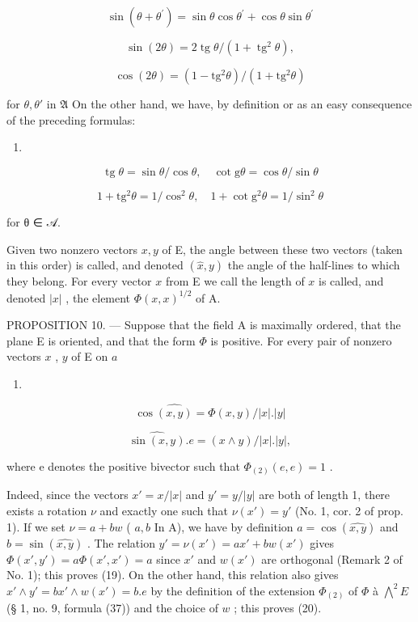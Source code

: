 \[
\sin (\theta + \theta^ {\prime}) = \sin \theta \cos \theta^ {\prime} + \cos \theta \sin \theta^ {\prime}\tag{16}
\]

\[
\sin (2 \theta) = 2 \operatorname{tg} \theta / (1 + \operatorname{tg} ^ {2} \theta),
\]

\[
\cos (2 \theta) = (1 - \mathrm{tg} ^ {2} \theta) / (1 + \mathrm{tg} ^ {2} \theta)
\]

for \(\theta, \theta'\) in \(\mathfrak{A}\) On the other hand, we have, by definition or as an easy consequence of the preceding formulas:

\begin{enumerate}
\def\labelenumi{(\arabic{enumi})}
\setcounter{enumi}{16}
\tightlist
\item
\end{enumerate}

\[
\operatorname{tg} \theta = \sin \theta / \cos \theta , \quad \cot \mathrm{g} \theta = \cos \theta / \sin \theta\tag{18}
\]

\[
1 + \mathrm{tg} ^ {2} \theta = 1 / \cos^ {2} \theta , \quad 1 + \cot \mathrm{g} ^ {2} \theta = 1 / \sin^ {2} \theta
\]

for θ ∈ 𝒜.

Given two nonzero vectors \(x, y\) of E, the angle between these two vectors (taken in this order) is called, and denoted \((\widehat{x}, y)\) the angle of the half-lines to which they belong. For every vector \(x\) from E we call the length of \(x\) is called, and denoted \(|x|\) , the element \(\Phi(x, x)^{1/2}\) of A.

PROPOSITION 10. --- Suppose that the field A is maximally ordered, that the plane E is oriented, and that the form \(\Phi\) is positive. For every pair of nonzero vectors \(x\) , \(y\) of E on \(a\)

\begin{enumerate}
\def\labelenumi{(\arabic{enumi})}
\setcounter{enumi}{18}
\tightlist
\item
\end{enumerate}

\[
\cos \widehat {(x , y)} = \Phi (x, y) / | x |. | y |\tag{20}
\]

\[
\widehat {\sin (x , y)}. e = (x \wedge y) / | x |. | y |,
\]

where e denotes the positive bivector such that \(\Phi_{(2)}(e, e) = 1\) .

Indeed, since the vectors \(x' = x / |x|\) and \(y' = y / |y|\) are both of length 1, there exists a rotation \(\nu\) and exactly one such that \(\nu(x') = y'\) (No. 1, cor. 2 of prop. 1). If we set \(\nu = a + bw\) ( \(a, b\) In A), we have by definition \(a = \cos(\widehat{x,y})\) and \(b = \sin(\widehat{x,y})\) . The relation \(y' = \nu(x') = ax' + bw(x')\) gives \(\Phi(x', y') = a\Phi(x', x') = a\) since \(x'\) and \(w(x')\) are orthogonal (Remark 2 of No. 1); this proves (19). On the other hand, this relation also gives \(x' \wedge y' = bx' \wedge w(x') = b.e\) by the definition of the extension \(\Phi_{(2)}\) of \(\Phi\) à \(\bigwedge^{2} E\) (§ 1, no. 9, formula (37)) and the choice of \(w\) ; this proves (20).

